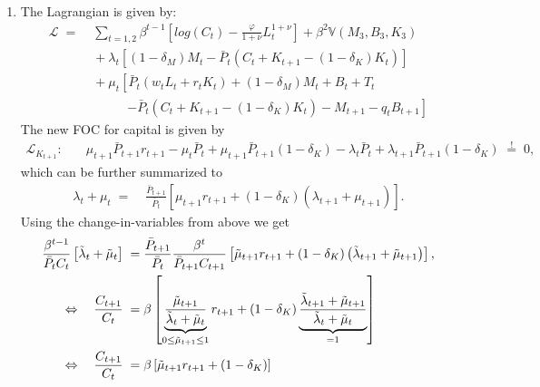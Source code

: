 \documentclass[a4paper, 12pt]{article}
\begin{document}
\bigskip%
\begin{Answer}%
	\begin{small}%
		\begin{enumerate}%
			\item[a) ] The Lagrangian is given by:%
			\begin{align*}%
				\mathcal{L} \; = & \; \sum_{t=1,2} \beta^{t-1} \left[ log(C_t) - \frac{\varphi}{1+\nu} L_t^{1+\nu} \right] + \beta^2 \mathbb{V} \left( M_3, B_3, K_3 \right)\\%
				& \; + \lambda_t \left[ (1-\delta_M) M_t - \bar{P}_t \left( C_t + K_{t+1} - (1-\delta_K) K_t \right) \right]\\%
				& \; + \mu_t \left[ \bar{P}_t (w_t L_t + r_t K_t) + (1-\delta_M) M_t + B_t + T_t \right.\\%
				& \quad \quad \quad \left. - \bar{P}_t \left(C_t + K_{t+1} - (1-\delta_K) K_t\right) - M_{t+1} - q_t B_{t+1} \right]%
			\end{align*}%
			The new FOC for capital is given by%
			\begin{align}%
				\mathcal{L}_{K_{t+1}}: \quad & \mu_{t+1} \bar{P}_{t+1} r_{t+1} - \mu_t \bar{P}_t + \mu_{t+1} \bar{P}_{t+1} (1-\delta_K) - \lambda_t \bar{P}_t + \lambda_{t+1} \bar{P}_{t+1} (1-\delta_K) \; \overset{!}{=} \; 0\label{eq:foc_capital_ex2},%
			\end{align}%
			which can be further summarized to%
			\begin{align*}%
				\lambda_t + \mu_t \; = & \; \frac{\bar{P}_{t+1}}{\bar{P}_t} \left[ \mu_{t+1} r_{t+1} + \left(1-\delta_K\right) \left(\lambda_{t+1} + \mu_{t+1} \right) \right].%
			\end{align*}%
			Using the change-in-variables from above we get%
			\begin{align}%
				\frac{\beta^{t-1}}{\bar{P}_t C_t} \left[ \tilde{\lambda}_t + \tilde{\mu}_t \right] \; = & \; \frac{\bar{P}_{t+1}}{\bar{P}_t} \frac{\beta^{t}}{\bar{P}_{t+1} C_{t+1}} \left[ \tilde{\mu}_{t+1} r_{t+1} + \left(1-\delta_K\right) \left(\tilde{\lambda}_{t+1} + \tilde{\mu}_{t+1} \right) \right],\notag\\%
				\Leftrightarrow \quad \frac{C_{t+1}}{C_t} \; = & \; \beta \left[ \underbrace{\frac{\tilde{\mu}_{t+1}}{\tilde{\lambda}_t + \tilde{\mu}_t}}_{0\leq\tilde{\mu}_{t+1}\leq1} r_{t+1} + \left(1-\delta_K\right) \underbrace{\frac{\tilde{\lambda}_{t+1} + \tilde{\mu}_{t+1}}{\tilde{\lambda}_t + \tilde{\mu}_t}}_{=1} \right]\notag\\%
				\Leftrightarrow \quad \frac{C_{t+1}}{C_t} \; = & \; \beta \left[ \tilde{\mu}_{t+1} r_{t+1} + (1-\delta_K) \right]\label{eq:foc_new_capital}%

\end{align}
\end{enumerate}
\end{small}
\end{Answer}
\end{document}
